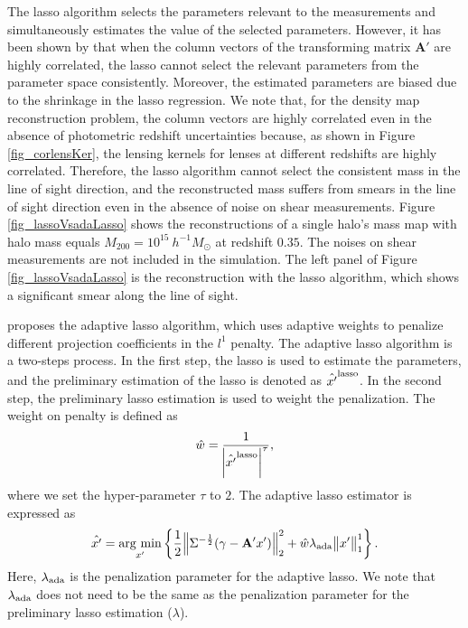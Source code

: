 \documentclass[twocolumn]{aastex62}
\newcommand{\argmin}{\mathop{\rm arg~min}\limits}
\begin{document}
The lasso algorithm selects the parameters relevant to the measurements and
simultaneously estimates the value of the selected parameters.  However, it has
been shown by \citet{AdaLASSO-Zou2006} that when the column vectors of the
transforming matrix $\mathbf{A'}$ are highly correlated, the lasso cannot
select the relevant parameters from the parameter space consistently.
Moreover, the estimated parameters are biased due to the shrinkage in the lasso
regression. We note that, for the density map reconstruction problem, the
column vectors are highly correlated even in the absence of photometric
redshift uncertainties because, as shown in Figure \ref{fig_corlensKer}, the
lensing kernels for lenses at different redshifts are highly correlated.
Therefore, the lasso algorithm cannot select the consistent mass in the line of
sight direction, and the reconstructed mass suffers from smears in the line of
sight direction even in the absence of noise on shear measurements.  Figure
\ref{fig_lassoVsadaLasso} shows the reconstructions of a single halo's mass map
with halo mass equals $M_{200}=10^{15} ~h^{-1}M_{\odot}$ at redshift $0.35$.
The noises on shear measurements are not included in the simulation.  The left
panel of Figure \ref{fig_lassoVsadaLasso} is the reconstruction with the lasso
algorithm, which shows a significant smear along the line of sight.

\citet{AdaLASSO-Zou2006} proposes the adaptive lasso algorithm, which uses
adaptive weights to penalize different projection coefficients in the $l^1$
penalty. The adaptive lasso algorithm is a two-steps process. In the first
step, the lasso is used to estimate the parameters, and the preliminary
estimation of the lasso is denoted as $\hat{x'}^{\rm{lasso}}$. In the second
step, the preliminary lasso estimation is used to weight the penalization. The
weight on penalty is defined as
\begin{equation}
\hat{w}= \frac{1}{\abs{\hat{x'}^{\rm{lasso}}}^\tau},
\end{equation}
where we set the hyper-parameter $\tau$ to $2$.  The adaptive lasso estimator is
expressed as
\begin{equation}\label{eq-lossFun}
\hat{x'}=\argmin_{x'} \left\{ \frac{1}{2} \norm{\Sigma^{-\frac{1}{2}}(\gamma-\mathbf{A'}x')}^2_2 +
\hat{w}\lambda_{\rm{ada}} \norm{x'}^1_1\right\}.
\end{equation}
Here, $\lambda_{\rm{ada}}$ is the penalization parameter for the adaptive
lasso.  We note that $\lambda_{\rm{ada}}$ does not need to be the same as the
penalization parameter for the preliminary lasso estimation
($\lambda$).
\end{document}
